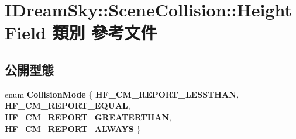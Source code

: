 \hypertarget{class_i_dream_sky_1_1_scene_collision_1_1_height_field}{}\section{I\+Dream\+Sky\+:\+:Scene\+Collision\+:\+:Height\+Field 類別 參考文件}
\label{class_i_dream_sky_1_1_scene_collision_1_1_height_field}
\subsection*{公開型態}
\begin{DoxyCompactItemize}
\item 
enum {\bfseries Collision\+Mode} \{ {\bfseries H\+F\+\_\+\+C\+M\+\_\+\+R\+E\+P\+O\+R\+T\+\_\+\+L\+E\+S\+S\+T\+H\+AN}, 
{\bfseries H\+F\+\_\+\+C\+M\+\_\+\+R\+E\+P\+O\+R\+T\+\_\+\+E\+Q\+U\+AL}, 
{\bfseries H\+F\+\_\+\+C\+M\+\_\+\+R\+E\+P\+O\+R\+T\+\_\+\+G\+R\+E\+A\+T\+E\+R\+T\+H\+AN}, 
{\bfseries H\+F\+\_\+\+C\+M\+\_\+\+R\+E\+P\+O\+R\+T\+\_\+\+A\+L\+W\+A\+YS}
 \}\hypertarget{class_i_dream_sky_1_1_scene_collision_1_1_height_field_aab26df2168cdaa34e86172856aa35993}{}\label{class_i_dream_sky_1_1_scene_collision_1_1_height_field_aab26df2168cdaa34e86172856aa35993}

\end{DoxyCompactItemize}
